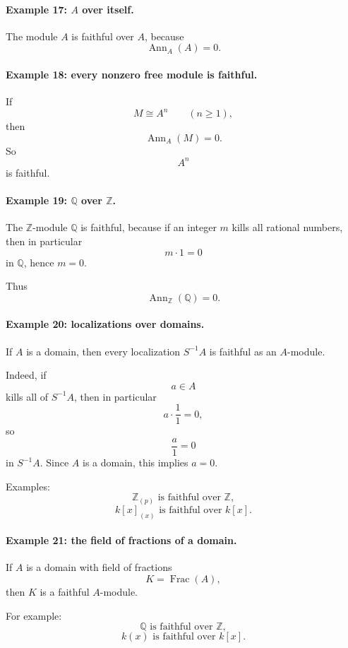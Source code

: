 \documentclass[12pt,a4paper]{article}
\theoremstyle{notespace}
\newcommand{\Frac}{\operatorname{Frac}}
\theoremstyle{definition}
\DeclareMathOperator{\Ann}{Ann}
\begin{document}
\paragraph{Example 17: \(A\) over itself.}

The module \(A\) is faithful over \(A\), because
\[
\Ann_A(A)=0.
\]

\paragraph{Example 18: every nonzero free module is faithful.}

If
\[
M\cong A^n
\qquad (n\ge 1),
\]
then
\[
\Ann_A(M)=0.
\]
So
\[
A^n
\]
is faithful.

\paragraph{Example 19: \(\mathbb Q\) over \(\mathbb Z\).}

The \(\mathbb Z\)-module \(\mathbb Q\) is faithful, because if an integer \(m\) kills all rational numbers, then in particular
\[
m\cdot 1=0
\]
in \(\mathbb Q\), hence \(m=0\).

Thus
\[
\Ann_{\mathbb Z}(\mathbb Q)=0.
\]

\paragraph{Example 20: localizations over domains.}

If \(A\) is a domain, then every localization \(S^{-1}A\) is faithful as an \(A\)-module.

Indeed, if
\[
a\in A
\]
kills all of \(S^{-1}A\), then in particular
\[
a\cdot \frac{1}{1}=0,
\]
so
\[
\frac{a}{1}=0
\]
in \(S^{-1}A\). Since \(A\) is a domain, this implies \(a=0\).

Examples:
\[
\mathbb Z_{(p)} \text{ is faithful over } \mathbb Z,
\]
\[
k[x]_{(x)} \text{ is faithful over } k[x].
\]

\paragraph{Example 21: the field of fractions of a domain.}

If \(A\) is a domain with field of fractions
\[
K=\Frac(A),
\]
then \(K\) is a faithful \(A\)-module.

For example:
\[
\mathbb Q \text{ is faithful over } \mathbb Z,
\]
\[
k(x) \text{ is faithful over } k[x].
\]
\end{document}
